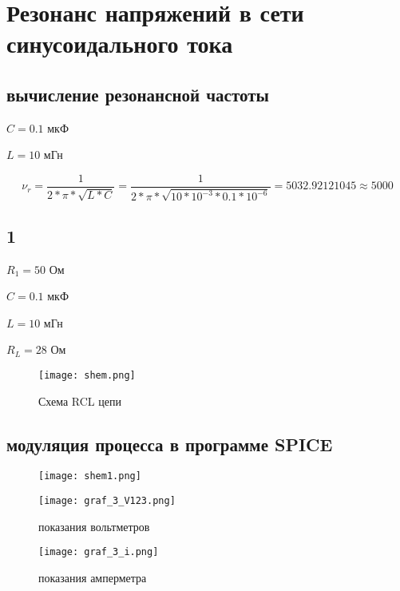 \documentclass[a4paper,14pt]{article}
\begin{document}


\section{Резонанс напряжений в сети синусоидального тока}
\subsection{вычисление резонансной частоты}
$C =  0.1$ мкФ 

$L = 10$ мГн

$$\nu_r = \dfrac{1}{2*\pi * \sqrt{L*C}} =\dfrac{1}{2*\pi* \sqrt{10 * 10^{-3}*0.1*10^{-6}}} = 5032.92121045 \approx 5000 $$

\subsection{1}
$R_1 = 50$ Ом 

$C =  0.1$ мкФ 

$L = 10$ мГн

$R_L = 28$ Ом
\begin{figure}[H]
	\centering
	\texttt{[image: shem.png]}
	\caption{Схема RCL цепи}	
\end{figure}


\subsection{модуляция процесса в программе SPICE}

\begin{figure}[H]
	\centering
	\texttt{[image: shem1.png]}	
\end{figure}

\begin{figure}[H]
	\centering
	\texttt{[image: graf\_3\_V123.png]}
	\caption{показания вольтметров}	
\end{figure}

\begin{figure}[H]
	\centering
	\texttt{[image: graf\_3\_i.png]}
	\caption{показания амперметра}	
\end{figure}
\end{document}
